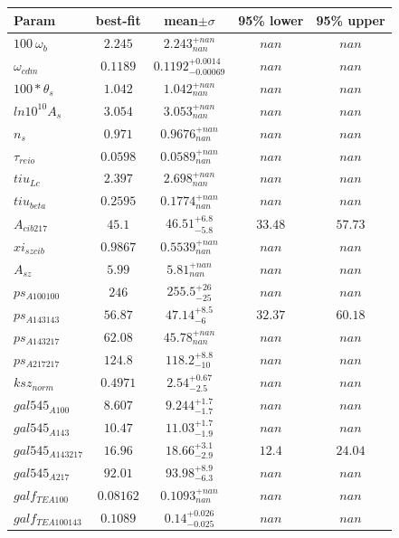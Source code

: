 \begin{tabular}{|l|c|c|c|c|} 
 \hline 
Param & best-fit & mean$\pm\sigma$ & 95\% lower & 95\% upper \\ \hline 
$100~\omega{}_{b }$ &$2.245$ & $2.243_{nan}^{+nan}$ & $nan$ & $nan$ \\ 
$\omega{}_{cdm }$ &$0.1189$ & $0.1192_{-0.00069}^{+0.0014}$ & $nan$ & $nan$ \\ 
$100*\theta{}_{s }$ &$1.042$ & $1.042_{nan}^{+nan}$ & $nan$ & $nan$ \\ 
$ln10^{10}A_{s }$ &$3.054$ & $3.053_{nan}^{+nan}$ & $nan$ & $nan$ \\ 
$n_{s }$ &$0.971$ & $0.9676_{nan}^{+nan}$ & $nan$ & $nan$ \\ 
$\tau{}_{reio }$ &$0.0598$ & $0.0589_{nan}^{+nan}$ & $nan$ & $nan$ \\ 
$tiu_{Lc }$ &$2.397$ & $2.698_{nan}^{+nan}$ & $nan$ & $nan$ \\ 
$tiu_{beta }$ &$0.2595$ & $0.1774_{nan}^{+nan}$ & $nan$ & $nan$ \\ 
$A_{cib 217 }$ &$45.1$ & $46.51_{-5.8}^{+6.8}$ & $33.48$ & $57.73$ \\ 
$xi_{sz cib }$ &$0.9867$ & $0.5539_{nan}^{+nan}$ & $nan$ & $nan$ \\ 
$A_{sz }$ &$5.99$ & $5.81_{nan}^{+nan}$ & $nan$ & $nan$ \\ 
$ps_{A 100 100 }$ &$246$ & $255.5_{-25}^{+26}$ & $nan$ & $nan$ \\ 
$ps_{A 143 143 }$ &$56.87$ & $47.14_{-6}^{+8.5}$ & $32.37$ & $60.18$ \\ 
$ps_{A 143 217 }$ &$62.08$ & $45.78_{nan}^{+nan}$ & $nan$ & $nan$ \\ 
$ps_{A 217 217 }$ &$124.8$ & $118.2_{-10}^{+8.8}$ & $nan$ & $nan$ \\ 
$ksz_{norm }$ &$0.4971$ & $2.54_{-2.5}^{+0.67}$ & $nan$ & $nan$ \\ 
$gal545_{A 100 }$ &$8.607$ & $9.244_{-1.7}^{+1.7}$ & $nan$ & $nan$ \\ 
$gal545_{A 143 }$ &$10.47$ & $11.03_{-1.9}^{+1.7}$ & $nan$ & $nan$ \\ 
$gal545_{A 143 217 }$ &$16.96$ & $18.66_{-2.9}^{+3.1}$ & $12.4$ & $24.04$ \\ 
$gal545_{A 217 }$ &$92.01$ & $93.98_{-6.3}^{+8.9}$ & $nan$ & $nan$ \\ 
$galf_{TE A 100 }$ &$0.08162$ & $0.1093_{nan}^{+nan}$ & $nan$ & $nan$ \\ 
$galf_{TE A 100 143 }$ &$0.1089$ & $0.14_{-0.025}^{+0.026}$ & $nan$ & $nan$ \\ 

\end{tabular}

